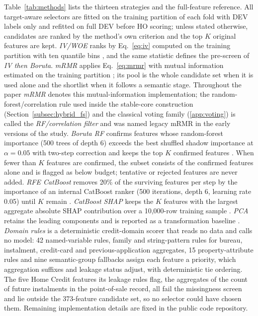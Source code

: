 \documentclass[final,5p,twocolumn]{elsarticle}
\newcommand{\Kfeat}{K}
\begin{document}
Table~\ref{tab:methods} lists the thirteen strategies and the full-feature reference. All target-aware selectors are fitted on the training partition of each fold with DEV labels only and refitted on full DEV before HO scoring; unless stated otherwise, candidates are ranked by the method's own criterion and the top $\Kfeat$ original features are kept. \emph{IV/WOE} ranks by Eq.~\eqref{eq:iv} computed on the training partition with ten quantile bins \cite{siddiqi2006}, and the same statistic defines the pre-screen of \emph{IV then Boruta}. \emph{mRMR} applies Eq.~\eqref{eq:mrmr} with mutual information estimated on the training partition \cite{peng2005,kraskov2004,ross2014}; its pool is the whole candidate set when it is used alone and the shortlist when it follows a semantic stage. Throughout the paper \emph{mRMR} denotes this mutual-information implementation; the random-forest/correlation rule used inside the stable-core construction (Section~\ref{subsec:hybrid_fs}) and the classical voting family (\ref{app:voting}) is called the \emph{RF/correlation filter} and was named legacy mRMR in the early versions of the study. \emph{Boruta RF} confirms features whose random-forest importance (500 trees of depth 6) exceeds the best shuffled shadow importance at $\alpha=0.05$ with two-step correction and keeps the top $\Kfeat$ confirmed features \cite{kursa2010,breiman2001}. When fewer than $\Kfeat$ features are confirmed, the subset consists of the confirmed features alone and is flagged as below budget; tentative or rejected features are never added. \emph{RFE CatBoost} removes 20\% of the surviving features per step by the importance of an internal CatBoost ranker (500 iterations, depth 6, learning rate 0.05) until $\Kfeat$ remain \cite{guyon2002}. \emph{CatBoost SHAP} keeps the $\Kfeat$ features with the largest aggregate absolute SHAP contribution over a 10,000-row training sample \cite{lundberg2017}. \emph{PCA} retains the leading components and is reported as a transformation baseline \cite{jolliffe2016}. \emph{Domain rules} is a deterministic credit-domain scorer that reads no data and calls no model: 42 named-variable rules, family and string-pattern rules for bureau, instalment, credit-card and previous-application aggregates, 15 property-attribute rules and nine semantic-group fallbacks assign each feature a priority, which aggregation suffixes and leakage status adjust, with deterministic tie ordering. The five Home Credit features its leakage rules flag, the aggregates of the count of future instalments in the point-of-sale record, all fail the missingness screen and lie outside the 373-feature candidate set, so no selector could have chosen them. Remaining implementation details are fixed in the public code repository.
\end{document}
